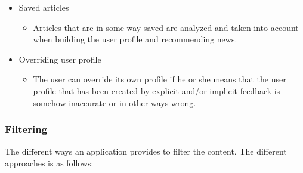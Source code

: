\begin{itemize}
	\item Saved articles
	\begin{itemize}
		\item Articles that are in some way saved are analyzed and taken into account when building the user profile and recommending news.
	\end{itemize}

	\item Overriding user profile
	\begin{itemize}
		\item The user can override its own profile if he or she means that the user profile that has been created by explicit and/or implicit feedback is somehow inaccurate or in other ways wrong.
	\end{itemize}
\end{itemize}


\subsubsection{Filtering}
The different ways an application provides to filter the content. The different approaches is as follows:

